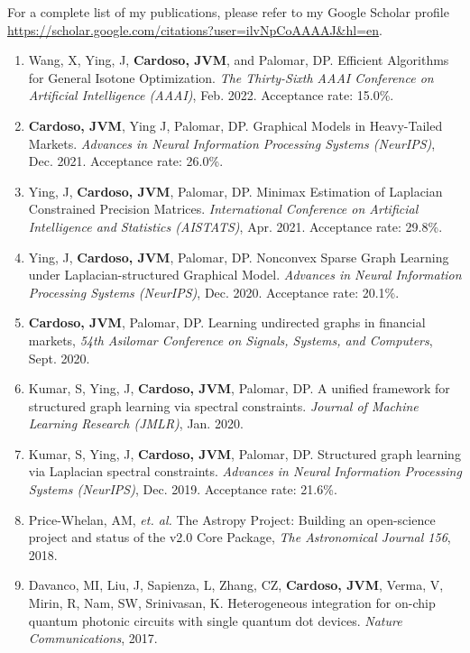 \documentclass[10pt]{article}
\begin{document}
\begin{titlepage}
{\small For a complete list of my publications, please refer to my Google Scholar profile \url{https://scholar.google.com/citations?user=ilvNpCoAAAAJ&hl=en}.}
\begin{enumerate}
  \item Wang, X, Ying, J, \textbf{Cardoso, JVM}, and Palomar, DP.
    Efficient Algorithms for General Isotone Optimization.
    \textit{The Thirty-Sixth AAAI Conference on Artificial Intelligence (AAAI)}, Feb. 2022. Acceptance rate: 15.0\%.
  \item \textbf{Cardoso, JVM}, Ying J, Palomar, DP. Graphical Models in Heavy-Tailed Markets.
  \textit{Advances in Neural Information Processing Systems (NeurIPS)}, Dec. 2021. Acceptance rate: 26.0\%.
  \item Ying, J, \textbf{Cardoso, JVM}, Palomar, DP. Minimax Estimation of Laplacian Constrained Precision Matrices.
    \textit{International Conference on Artificial Intelligence and Statistics (AISTATS)}, Apr. 2021. Acceptance rate: 29.8\%.
  \item Ying, J, \textbf{Cardoso, JVM}, Palomar, DP. Nonconvex Sparse Graph Learning under Laplacian-structured Graphical Model.
  \textit{Advances in Neural Information Processing Systems (NeurIPS)}, Dec. 2020. Acceptance rate: 20.1\%.
  \item \textbf{Cardoso, JVM}, Palomar, DP. Learning undirected graphs in financial markets, \textit{54th Asilomar Conference on Signals, Systems, and Computers}, Sept. 2020.
  \item Kumar, S, Ying, J, \textbf{Cardoso, JVM}, Palomar, DP. A unified framework for structured graph
    learning via spectral constraints. \textit{Journal of Machine Learning Research (JMLR)}, Jan. 2020.
  \item Kumar, S, Ying, J, \textbf{Cardoso, JVM}, Palomar, DP. Structured graph learning via Laplacian
    spectral constraints. \textit{Advances in Neural Information Processing Systems (NeurIPS)}, Dec. 2019. Acceptance rate: 21.6\%.
  \item Price-Whelan, AM, \textit{et. al.} The Astropy Project: Building an open-science project and status of the v2.0 Core Package, \textit{The Astronomical Journal 156}, 2018.
\item Davanco, MI, Liu, J, Sapienza, L, Zhang, CZ, \textbf{Cardoso, JVM}, Verma, V, Mirin, R, Nam,
SW, Srinivasan, K. Heterogeneous integration for on-chip quantum photonic circuits with single quantum dot devices.
\textit{Nature Communications}, 2017.
\end{enumerate}



\end{titlepage}
\end{document}
